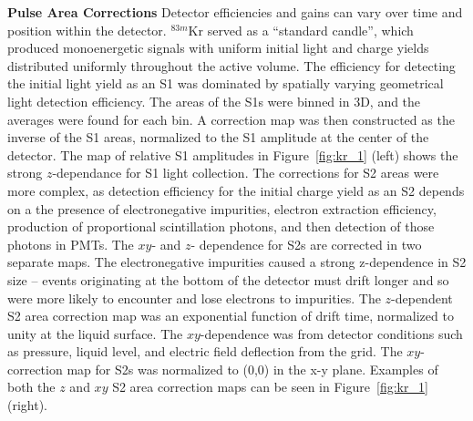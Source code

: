 \textbf{Pulse Area Corrections} Detector efficiencies and gains can vary over time and position within the detector. $^{83m}$Kr served as a ``standard candle'', which produced monoenergetic signals with uniform initial light and charge yields distributed uniformly throughout the active volume. The efficiency for detecting the initial light yield as an S1 was dominated by spatially varying geometrical light detection efficiency. The areas of the S1s were binned in 3D, and the averages were found for each bin. A correction map was then constructed as the inverse of the S1 areas, normalized to the S1 amplitude at the center of the detector. The map of relative S1 amplitudes in Figure~\ref{fig:kr_1} (left) shows the strong $z$-dependance for S1 light collection. The corrections for S2 areas were more complex, as detection efficiency for the initial charge yield as an S2 depends on a the presence of electronegative impurities, electron extraction efficiency, production of proportional scintillation photons, and then detection of those photons in PMTs. The $xy$- and $z$- dependence for S2s are corrected in two separate maps. The electronegative impurities caused a strong z-dependence in S2 size -- events originating at the bottom of the detector must drift longer and so were more likely to encounter and lose electrons to impurities. The $z$-dependent S2 area correction map was an exponential function of drift time, normalized to unity at the liquid surface. The $xy$-dependence was from detector conditions such as pressure, liquid level, and electric field deflection from the grid. The $xy$-correction map for S2s was normalized to (0,0) in the x-y plane. Examples of both the $z$ and $xy$ S2 area correction maps can be seen in Figure~\ref{fig:kr_1} (right).

